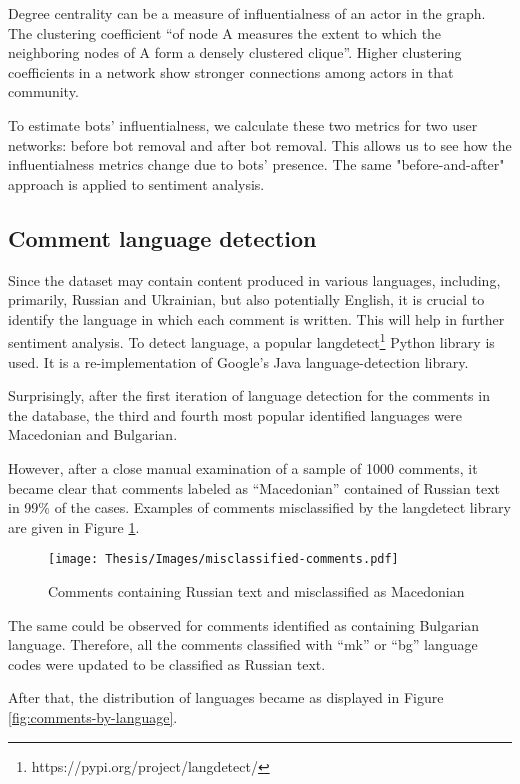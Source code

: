 Degree centrality can be a measure of influentialness of an actor in the graph\cite{Hagen2022}.  The clustering coefficient ``of node A measures the extent to which the neighboring nodes of A form a densely clustered clique''\cite{Hagen2022}. Higher clustering coefficients in a network show stronger connections among actors in that community\cite{Hagen2022}. 

To estimate bots' influentialness, we calculate these two metrics for two user networks: before bot removal and after bot removal. This allows us to see how the influentialness metrics change due to bots' presence. The same "before-and-after" approach is applied to sentiment analysis.

\subsection{Comment language detection}
Since the dataset may contain content produced in various languages, including, primarily, Russian and Ukrainian, but also potentially English, it is crucial to identify the language in which each comment is written. This will help in further sentiment analysis. To detect language, a popular langdetect\footnote{https://pypi.org/project/langdetect/} Python library is used. It is a re-implementation of Google’s Java language-detection library.

Surprisingly, after the first iteration of language detection for the comments in the database, the third and fourth most popular identified languages were Macedonian and Bulgarian.

However, after a close manual examination of a sample of 1000 comments, it became clear that comments labeled as ``Macedonian'' contained of Russian text in 99\% of the cases. Examples of comments misclassified by the langdetect library are given in Figure \ref{fig:misclassified-comments}.

\begin{figure}
	\centering
	\texttt{[image: Thesis/Images/misclassified-comments.pdf]}
	\caption{Comments containing Russian text and misclassified as Macedonian}
	\label{fig:misclassified-comments}
\end{figure}

The same could be observed for comments identified as containing Bulgarian language. Therefore, all the comments classified with ``mk'' or ``bg'' language codes were updated to be classified as Russian text.

After that, the distribution of languages became as displayed in Figure \ref{fig:comments-by-language}.

